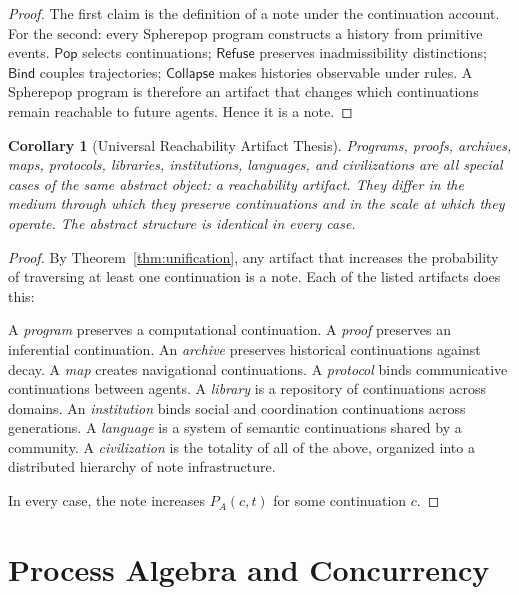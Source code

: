 \documentclass[12pt, a4paper, openany]{book}
\theoremstyle{plain}
\newtheorem{corollary}[theorem]{Corollary}
\theoremstyle{definition}
\theoremstyle{remark}
\newcommand{\Pop}{\mathsf{Pop}}
\newcommand{\Refuse}{\mathsf{Refuse}}
\newcommand{\Bind}{\mathsf{Bind}}
\newcommand{\Collapse}{\mathsf{Collapse}}
\begin{document}
\begin{proof}
The first claim is the definition of a note under the continuation account. For
the second: every Spherepop program constructs a history from primitive events.
$\Pop$ selects continuations; $\Refuse$ preserves inadmissibility distinctions;
$\Bind$ couples trajectories; $\Collapse$ makes histories observable under rules.
A Spherepop program is therefore an artifact that changes which continuations
remain reachable to future agents. Hence it is a note.
\end{proof}

\begin{corollary}[Universal Reachability Artifact Thesis]
Programs, proofs, archives, maps, protocols, libraries, institutions, languages,
and civilizations are all special cases of the same abstract object: a reachability
artifact. They differ in the medium through which they preserve continuations and
in the scale at which they operate. The abstract structure is identical in every
case.
\end{corollary}

\begin{proof}
By Theorem~\ref{thm:unification}, any artifact that increases the probability of
traversing at least one continuation is a note. Each of the listed artifacts does
this:

A \emph{program} preserves a computational continuation.
A \emph{proof} preserves an inferential continuation.
An \emph{archive} preserves historical continuations against decay.
A \emph{map} creates navigational continuations.
A \emph{protocol} binds communicative continuations between agents.
A \emph{library} is a repository of continuations across domains.
An \emph{institution} binds social and coordination continuations across
generations.
A \emph{language} is a system of semantic continuations shared by a community.
A \emph{civilization} is the totality of all of the above, organized into a
distributed hierarchy of note infrastructure.

In every case, the note increases $P_A(c, t)$ for some continuation $c$.
\end{proof}


\part{Process Algebra and Concurrency}
\end{document}
